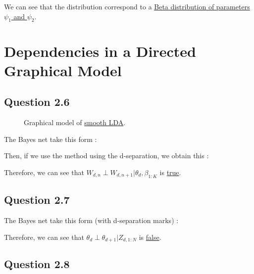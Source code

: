 \documentclass{article}
\begin{document}
We can see that the distribution correspond to a \underline{Beta distribution of parameters $\psi_1$ and $\psi_2$}.

\section{Dependencies in a Directed Graphical Model}

\subsection*{Question 2.6}

\begin{figure}[H]
    \centering
    
    \caption{Graphical model of \href{https://www.jmlr.org/papers/volume3/blei03a/blei03a.pdf}{smooth LDA}.}
    \label{fig:fig1}
\end{figure}

The Bayes net take this form :

\begin{figure}[H]
    \centering
    
    \label{fig:fig1.2.6.1}
\end{figure}

Then, if we use the method using the d-separation, we obtain this :

\begin{figure}[H]
    \centering
    
    \label{fig:fig1.2.6.2}
\end{figure}

Therefore, we can see that $W_{d,n} \perp W_{d,n+1} | \theta_d, \beta_{1:K}$ is \underline{true}.

\subsection*{Question 2.7}

The Bayes net take this form (with d-separation marks) :
\begin{figure}[H]
    \centering
    
    \label{fig:fig1.2.7}
\end{figure}

Therefore, we can see that $\theta_{d} \perp \theta_{d+1} | Z_{d,1:N}$ is \underline{false}.

\subsection*{Question 2.8}
\end{document}
